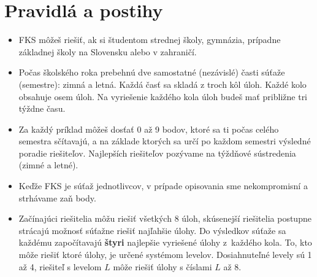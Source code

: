 \pagestyle{rules}

\section{Pravidlá a postihy}
    \begin{itemize}
        \item FKS môžeš riešiť, ak si študentom strednej školy, gymnázia,
            prípadne základnej školy na Slovensku alebo v zahraničí.
        \item Počas školského roka prebehnú dve samostatné (nezávislé) časti súťaže (semestre):
            zimná a letná. Každá časť sa skladá z troch kôl úloh. Každé kolo obsahuje osem úloh.
            Na vyriešenie každého kola úloh budeš mať približne tri týždne času.
        \item Za každý príklad môžeš dosťať 0 až 9 bodov, ktoré sa ti počas celého semestra sčítavajú,
            a na základe ktorých sa určí po každom semestri výsledné poradie riešiteľov.
            Najlepších riešiteľov pozývame na týždňové sústredenia (zimné a letné).
        \item Keďže FKS je súťaž jednotlivcov, v prípade opisovania sme nekompromisní a strhávame zaň body.
        \item Začínajúci riešitelia môžu riešiť všetkých 8 úloh, skúsenejší riešitelia postupne strácajú
            možnosť súťažne riešiť najľahšie úlohy. Do výsledkov súťaže sa každému započítavajú \textbf{štyri}
            najlepšie vyriešené úlohy z~každého kola. To, kto môže riešiť ktoré úlohy,
            je určené systémom levelov. Dosiahnuteľné levely sú 1 až 4,
            riešiteľ s levelom $L$ môže riešiť úlohy s číslami $L$ až 8.
    \end{itemize}

